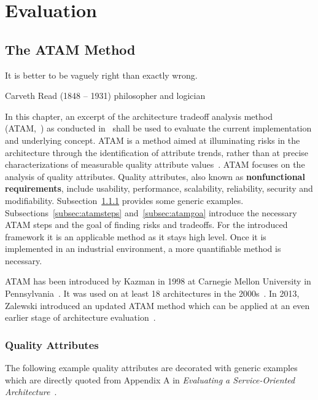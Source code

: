 \chapter{Evaluation\label{cha:chapter6}}

\section{The ATAM Method}
\epigraph{It is better to be vaguely right than exactly wrong.}{Carveth Read (1848 – 1931) philosopher and logician}
In this chapter, an excerpt of the architecture tradeoff analysis method (ATAM,~\cite{Kazman1998TheMethod}) as conducted in~\cite{Bianco2007EvaluatingArchitecture} shall be used to evaluate the current implementation and underlying concept. ATAM is a method aimed at illuminating risks in the architecture through the identification of attribute trends, rather than at precise characterizations of measurable quality attribute values~\cite{Kazman1999ExperienceAnalysis}. ATAM focuses on the analysis of quality attributes. Quality attributes, also known as \textbf{nonfunctional requirements}, include usability, performance, scalability, reliability, security and modifiability. Subsection~\ref{subseb:qualatt} provides some generic examples. Subsections~\ref{subsec:atamsteps} and~\ref{subsec:atamgoa} introduce the necessary ATAM steps and the goal of finding risks and tradeoffs. For the introduced framework it is an applicable method as it stays high level. Once it is implemented in an industrial environment, a more quantifiable method is necessary.  

ATAM has been introduced by Kazman in 1998 at Carnegie Mellon University in Pennsylvania~\cite{Kazman1998TheMethod}. It was used on at least 18 architectures in the 2000s~\cite{Bass2007RiskEvaluations}. In 2013, Zalewski introduced an updated ATAM method which can be applied at an even earlier stage of architecture evaluation~\cite{Zalewski2013BeyondSystems}.

\subsection{Quality Attributes}
\label{subseb:qualatt}
The following example quality attributes are decorated with generic examples which are directly quoted from Appendix A in \textit{Evaluating a Service-Oriented Architecture}~\cite{Bianco2007EvaluatingArchitecture}.
